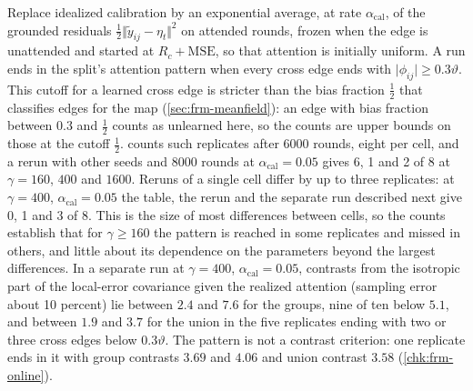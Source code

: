 \begin{observation}\label{obs:frm-online}
Replace idealized calibration by an exponential average, at rate $\alpha_{\mathrm{cal}}$, of the grounded residuals $\frac12\Vert\tilde y_{ij}-\eta_t\Vert^2$ on attended rounds, frozen when the edge is unattended and started at $R_c+\mathrm{MSE}$, so that attention is initially uniform. A run ends in the split's attention pattern when every cross edge ends with $\vert\phi_{ij}\vert\ge0.3\vartheta$. This cutoff for a learned cross edge is stricter than the bias fraction $\frac12$ that classifies edges for the map (\cref{sec:frm-meanfield}): an edge with bias fraction between $0.3$ and $\frac12$ counts as unlearned here, so the counts are upper bounds on those at the cutoff $\frac12$.  counts such replicates after 6000 rounds, eight per cell, and a rerun with other seeds and 8000 rounds at $\alpha_{\mathrm{cal}}=0.05$ gives 6, 1 and 2 of 8 at $\gamma=160$, $400$ and $1600$. Reruns of a single cell differ by up to three replicates: at $\gamma=400$, $\alpha_{\mathrm{cal}}=0.05$ the table, the rerun and the separate run described next give 0, 1 and 3 of 8. This is the size of most differences between cells, so the counts establish that for $\gamma\ge160$ the pattern is reached in some replicates and missed in others, and little about its dependence on the parameters beyond the largest differences. In a separate run at $\gamma=400$, $\alpha_{\mathrm{cal}}=0.05$, contrasts from the isotropic part of the local-error covariance given the realized attention (sampling error about 10 percent) lie between $2.4$ and $7.6$ for the groups, nine of ten below $5.1$, and between $1.9$ and $3.7$ for the union in the five replicates ending with two or three cross edges below $0.3\vartheta$. The pattern is not a contrast criterion: one replicate ends in it with group contrasts $3.69$ and $4.06$ and union contrast $3.58$ (\cref{chk:frm-online}).
\end{observation}

